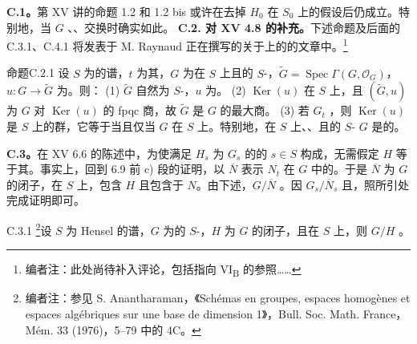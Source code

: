 \textbf{C.1。}第 XV 讲的命题 1.2 和 1.2 bis 或许在去掉 $H_0$ 在 $S_0$ 上的假设后仍成立。特别地，当 $G$ 、、交换时确实如此。
\textbf{C.2. 对 XV 4.8 的补充。}下述命题及后面的 C.3.1、C.4.1 将发表于 M. Raynaud 正在撰写的关于上的的文章中。\footnote{编者注：此处尚待补入评论，包括指向 VI\textsubscript{B} 的参照……}
\begin{SGAresult}{命题}{C.2.1}
设 $S$ 为的谱，$t$ 为其，$G$ 为在 $S$ 上且的 $S$-，$\widetilde G=\operatorname{Spec}\Gamma(G,\mathscr O_G)$，$u:G\to\widetilde G$ 为。则：
(1) $\widetilde G$ 自然为 $S$-，$u$ 为。
(2) $\operatorname{Ker}(u)$ 在 $S$ 上，且 $(\widetilde G,u)$ 为 $G$ 对 $\operatorname{Ker}(u)$ 的 fpqc 商，故 $\widetilde G$ 是 $G$ 的最大商。
(3) 若 $G_t$ ，则 $\operatorname{Ker}(u)$ 是 $S$ 上的群，它等于当且仅当 $G$ 在 $S$ 上。特别地，在 $S$ 上、、且的 $S$- $G$ 是的。
\end{SGAresult}

\textbf{C.3。}在 XV 6.6 的陈述中，为使满足 $H_s$ 为 $G_s$ 的的 $s\in S$ 构成，无需假定 $H$ 等于其。事实上，回到 6.9 前 c) 段的证明，以 $\overline N$ 表示 $N_t$ 在 $G$ 中的。于是 $\overline N$ 为 $G$ 的闭子，在 $S$ 上，包含 $H$ 且包含于 $N$。由下述，$G/\overline N$ 。因 $G_s/\overline N_s$ 且，照所引处完成证明即可。
\begin{SGAresult}{}{C.3.1}
\footnote{编者注：参见 S. Anantharaman，《Schémas en groupes, espaces homogènes et espaces algébriques sur une base de dimension 1》，Bull. Soc. Math. France，Mém. 33 (1976)，5--79 中的 4C。}设 $S$ 为 Hensel 的谱，$G$ 为的 $S$-，$H$ 为 $G$ 的闭子，且在 $S$ 上，则 $G/H$ 。
\end{SGAresult}

